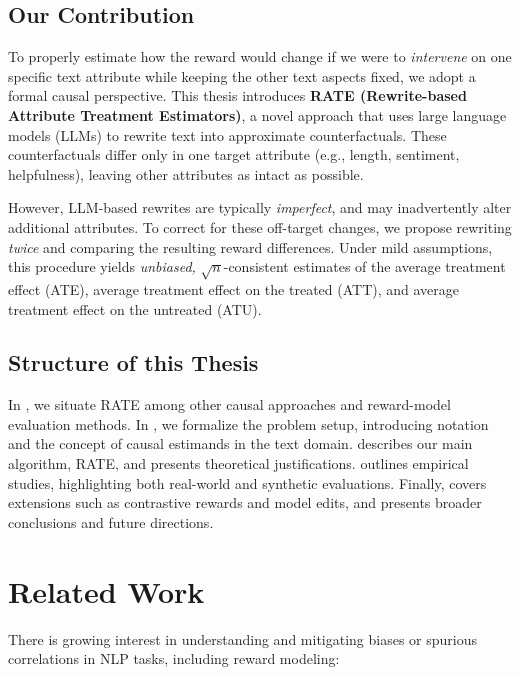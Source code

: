 \subsection{Our Contribution}
To properly estimate how the reward would change if we were to \emph{intervene} on one specific text attribute while keeping the other text aspects fixed, we adopt a formal causal perspective. This thesis introduces \textbf{RATE (Rewrite-based Attribute Treatment Estimators)}, a novel approach that uses large language models (LLMs) to rewrite text into approximate counterfactuals. These counterfactuals differ only in one target attribute (e.g., length, sentiment, helpfulness), leaving other attributes as intact as possible.

However, LLM-based rewrites are typically \emph{imperfect}, and may inadvertently alter additional attributes. To correct for these off-target changes, we propose rewriting \emph{twice} and comparing the resulting reward differences. Under mild assumptions, this procedure yields \emph{unbiased,} $\sqrt{n}$-consistent estimates of the average treatment effect (ATE), average treatment effect on the treated (ATT), and average treatment effect on the untreated (ATU).

\subsection{Structure of this Thesis}
In , we situate RATE among other causal approaches and reward-model evaluation methods. In , we formalize the problem setup, introducing notation and the concept of causal estimands in the text domain.  describes our main algorithm, RATE, and  presents theoretical justifications.  outlines empirical studies, highlighting both real-world and synthetic evaluations. Finally,  covers extensions such as contrastive rewards and model edits, and  presents broader conclusions and future directions.

\section{Related Work}
\label{sec:related_work}

There is growing interest in understanding and mitigating biases or spurious correlations in NLP tasks, including reward modeling:

